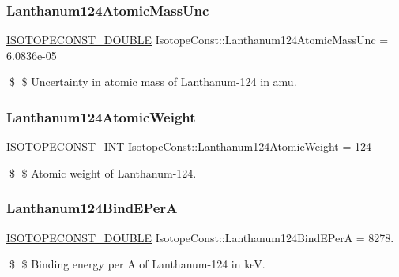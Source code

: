 \subsubsection{\texorpdfstring{Lanthanum124\+Atomic\+Mass\+Unc}{Lanthanum124AtomicMassUnc}}
{\footnotesize\ttfamily \mbox{\hyperlink{group___isotope_const-_macros_ga8f45a7272ce02c0b4c65c44636ed719a}{I\+S\+O\+T\+O\+P\+E\+C\+O\+N\+S\+T\+\_\+\+D\+O\+U\+B\+LE}} Isotope\+Const\+::\+Lanthanum124\+Atomic\+Mass\+Unc = 6.\+0836e-\/05}

\$ \$ Uncertainty in atomic mass of Lanthanum-\/124 in amu. \mbox{\label{group___isotope_const-_lanthanum-_la124_ga319afb545064363e6221c207bec421f8}} 
\subsubsection{\texorpdfstring{Lanthanum124\+Atomic\+Weight}{Lanthanum124AtomicWeight}}
{\footnotesize\ttfamily \mbox{\hyperlink{group___isotope_const-_macros_ga5f18360b3e99483a35c32d789e62621c}{I\+S\+O\+T\+O\+P\+E\+C\+O\+N\+S\+T\+\_\+\+I\+NT}} Isotope\+Const\+::\+Lanthanum124\+Atomic\+Weight = 124}

\$ \$ Atomic weight of Lanthanum-\/124. \mbox{\label{group___isotope_const-_lanthanum-_la124_ga4788768579717388d2c74f72f6fa1566}} 
\subsubsection{\texorpdfstring{Lanthanum124\+Bind\+E\+PerA}{Lanthanum124BindEPerA}}
{\footnotesize\ttfamily \mbox{\hyperlink{group___isotope_const-_macros_ga8f45a7272ce02c0b4c65c44636ed719a}{I\+S\+O\+T\+O\+P\+E\+C\+O\+N\+S\+T\+\_\+\+D\+O\+U\+B\+LE}} Isotope\+Const\+::\+Lanthanum124\+Bind\+E\+PerA = 8278.}

\$ \$ Binding energy per A of Lanthanum-\/124 in keV. \mbox{\label{group___isotope_const-_lanthanum-_la124_gaa3aa14318ac61b6d64b01da42663eac9}} 
